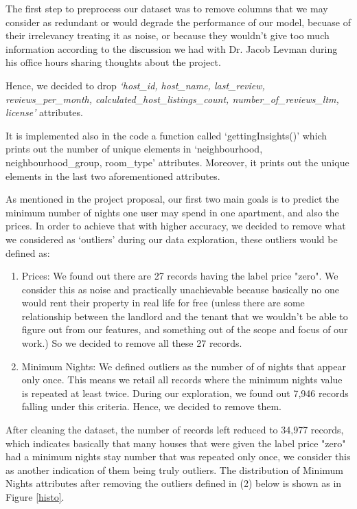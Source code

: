 \documentclass[a4paper,12pt]{article}
\begin{document}
The first step to preprocess our dataset was to remove columns that we may consider as redundant or would degrade the performance of our model, becuase of their irrelevancy treating it as noise, or because they wouldn't give too much information according to the discussion we had with Dr. Jacob Levman during his office hours sharing thoughts about the project.

Hence, we decided to drop \textit{`host\_id, host\_name, last\_review, reviews\_per\_month, calculated\_host\_listings\_count, number\_of\_reviews\_ltm, license'} attributes.

It is implemented also in the code a function called `gettingInsights()' which prints out the number of unique elements in `neighbourhood, neighbourhood\_group, room\_type' attributes. Moreover, it prints out the unique elements in the last two aforementioned attributes.

As mentioned in the project proposal, our first two main goals is to predict the minimum number of nights one user may spend in one apartment, and also the prices. In order to achieve that with higher accuracy, we decided to remove what we considered as `outliers' during our data exploration, these outliers would be defined as:

\begin{enumerate}
    \item Prices: We found out there are 27 records having the label price "zero". We consider this as noise and practically unachievable because basically no one would rent their property in real life for free (unless there are some relationship between the landlord and the tenant that we wouldn't be able to figure out from our features, and something out of the scope and focus of our work.) So we decided to remove all these 27 records.

    \item Minimum Nights: We defined outliers as the number of of nights that appear only once. This means we retail all records where the minimum nights value is repeated at least twice. During our exploration, we found out 7,946 records falling under this criteria. Hence, we decided to remove them.
\end{enumerate}

After cleaning the dataset, the number of records left reduced to 34,977 records, which indicates basically that many houses that were given the label price "zero" had a minimum nights stay number that was repeated only once, we consider this as another indication of them being truly outliers. The distribution of Minimum Nights attributes after removing the outliers defined in (2) below is shown as in Figure \ref{histo}. \newline
\end{document}
